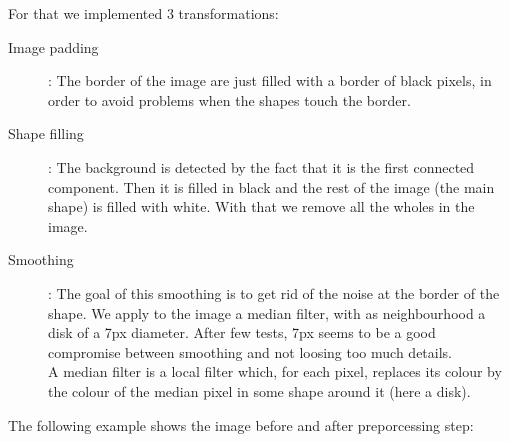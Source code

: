 \documentclass[12pt]{article}
\begin{document}
For that we implemented 3 transformations:
\begin{description}
	\item[Image padding]: The border of the image are just filled with a border of black pixels, in order to avoid problems when the shapes touch the border.
        \item[Shape filling]: The background is detected by the fact that it is the first connected component. Then it is filled in black and the rest of the image (the main shape) is filled with white. With that we remove all the wholes in the image.
        \item[Smoothing]: The goal of this smoothing is to get rid of the noise at the border of the shape. We apply to the image a median filter, with as neighbourhood a disk of a 7px diameter. After few tests, 7px seems to be a good compromise between smoothing and not loosing too much details. \\
        A median filter is a local filter which, for each pixel, replaces its colour by the colour of the median pixel in some shape around it (here a disk).

\end{description}

The following example shows the image before and after preporcessing step:
\end{document}
